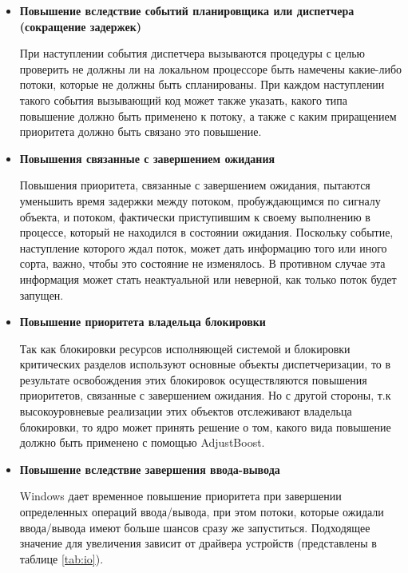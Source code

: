 \begin{itemize}
    \item \textbf{Повышение вследствие событий планировщика или диспетчера (сокращение задержек)}
    
    При наступлении события диспетчера вызываются процедуры с целью проверить не должны ли на локальном процессоре быть намечены какие-либо потоки, которые не должны быть спланированы. При каждом наступлении такого события вызывающий код может также указать, какого типа повышение должно быть применено к потоку, а также с каким приращением приоритета должно быть связано это повышение.
    \item \textbf{Повышения связанные с завершением ожидания}
    
    Повышения приоритета, связанные с завершением ожидания, пытаются уменьшить время задержки между потоком, пробуждающимся по сигналу объекта, и потоком, фактически приступившим к своему выполнению в процессе, который не находился в состоянии ожидания. Поскольку событие, наступление которого ждал поток, может дать информацию того или иного сорта, важно, чтобы это состояние не изменялось. В противном случае эта информация может стать неактуальной или неверной, как только поток будет запущен.
    
    \item \textbf{Повышение приоритета владельца блокировки}
    
    Так как блокировки ресурсов исполняющей системой и блокировки критических разделов используют основные объекты диспетчеризации, то в результате освобождения этих блокировок осуществляются повышения приоритетов, связанные с завершением ожидания. Но с другой стороны, т.к высокоуровневые реализации этих объектов отслеживают владельца блокировки, то ядро может принять решение о том, какого вида повышение должно быть применено с помощью AdjustBoost.
    
    \item \textbf{Повышение вследствие завершения ввода-вывода}
    
    Windows дает временное повышение приоритета при завершении определенных операций ввода/вывода, при этом потоки, которые ожидали ввода/вывода имеют больше шансов сразу же запуститься. Подходящее значение для увеличения зависит от драйвера устройств (представлены в таблице \ref{tab:io}).
    

\end{itemize}
